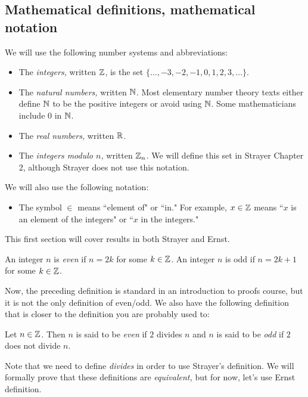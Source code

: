 \documentclass{../ximera}
\begin{document}
\subsection{Mathematical definitions, mathematical notation}%
\begin{defn}\label{defn:number-systems} 
  We will use the following number systems and abbreviations:
  \begin{itemize}
    \item The \emph{integers,} written $\mathbb Z$, is the set $\{\dots,-3,-2,-1,0,1,2,3,\dots\}$. 
    \item The \emph{natural numbers,} written $\mathbb N$. Most elementary number theory texts either define $\mathbb N$ to be the positive integers or avoid using $\mathbb N$. Some mathematicians include $0$ in $\mathbb N$.
    \item The \emph{real numbers,} written $\mathbb R$.
    \item The \emph{integers modulo $n$,} written $\mathbb Z_n$. We will define this set in Strayer Chapter 2, although Strayer does not use this notation.
  \end{itemize}
  We will also use the following notation:
  \begin{itemize}
    \item The symbol $\in$ means ``element of" or ``in." For example, $x\in\mathbb Z$ means ``$x$ is an element of the integers" or ``$x$ in the integers."
  \end{itemize}
\end{defn}

This first section will cover results in both Strayer and Ernst.

\begin{defn}\label{defn:even-odd-form}
  An integer $n$ is \emph{even} if $n=2k$ for some $k\in\mathbb Z$. 
  An integer $n$ is odd if $n=2k+1$ for some $k\in\mathbb Z$.
\end{defn}

Now, the preceding definition is standard in an introduction to proofs course, but it is not the only definition of even/odd. We also have the following definition that is closer to the definition you are probably used to:

\begin{defn}\label{defn:even-odd-divides}
  Let $n\in\mathbb Z$. Then $n$ is said to be \emph{even} if $2$ divides $n$ and $n$ is said to be \emph{odd} if $2$ does not divide $n$.
\end{defn}
Note that we need to define \emph{divides} in order to use Strayer's definition. We will formally prove that these definitions are \emph{equivalent,} but for now, let's use Ernst definition.
 
\end{document}
